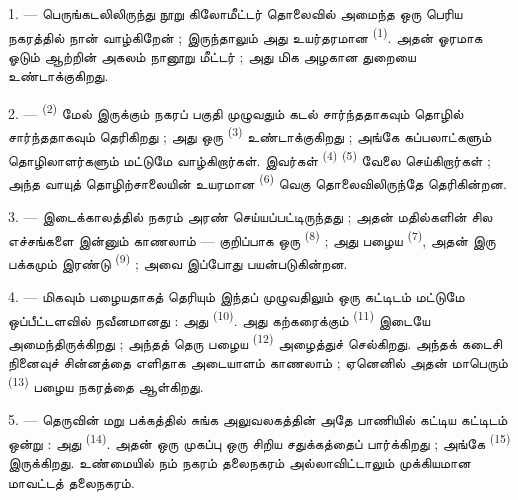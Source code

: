 \VUsaut{2.0mm}
\VUsaut{3.0mm}
\VUfilet{16mm}
\VUsaut{5.6mm}
\VUsaut{1.4mm}
\VUsaut{2.2mm}

\VUsaut{3.0mm}

1. --- பெருங்கடலிலிருந்து நூறு கிலோமீட்டர் தொலைவில் அமைந்த ஒரு பெரிய
நகரத்தில் நான் வாழ்கிறேன் ; இருந்தாலும் அது உயர்தரமான 
\textsuperscript{(1)}. அதன் ஓரமாக ஓடும் ஆற்றின் அகலம் நானூறு மீட்டர் ;
அது மிக அழகான துறையை உண்டாக்குகிறது.

2. ---  \textsuperscript{(2)} மேல் இருக்கும் நகரப்
பகுதி முழுவதும் கடல் சார்ந்ததாகவும் தொழில் சார்ந்ததாகவும் தெரிகிறது ;
அது ஒரு  \textsuperscript{(3)} உண்டாக்குகிறது ; அங்கே
கப்பலாட்களும் தொழிலாளர்களும் மட்டுமே வாழ்கிறார்கள். இவர்கள்
 \textsuperscript{(4)}  \textsuperscript{(5)} வேலை செய்கிறார்கள் ; அந்த
வாயுத் தொழிற்சாலையின் உயரமான 
\textsuperscript{(6)}  வெகு தொலைவிலிருந்தே
தெரிகின்றன.

3. --- இடைக்காலத்தில் நகரம் அரண் செய்யப்பட்டிருந்தது ; அதன் மதில்களின்
சில எச்சங்களை இன்னும் காணலாம் — குறிப்பாக ஒரு  \textsuperscript{(8)} ; அது பழைய
 \textsuperscript{(7)}, அதன் இரு பக்கமும் இரண்டு 
\textsuperscript{(9)} ; அவை இப்போது 
பயன்படுகின்றன.

4. --- மிகவும் பழையதாகத் தெரியும் இந்தப்  முழுவதிலும்
ஒரு கட்டிடம் மட்டுமே ஒப்பீட்டளவில் நவீனமானது : அது  \textsuperscript{(10)}. அது கற்கரைக்கும் 
\textsuperscript{(11)} இடையே அமைந்திருக்கிறது ; அந்தத் தெரு பழைய
 \textsuperscript{(12)} அழைத்துச் செல்கிறது.
அந்தக் கடைசி நினைவுச் சின்னத்தை எளிதாக அடையாளம் காணலாம் ; ஏனெனில்
அதன் மாபெரும்  \textsuperscript{(13)} பழைய
நகரத்தை ஆள்கிறது.

5. --- தெருவின் மறு பக்கத்தில் சுங்க அலுவலகத்தின் அதே பாணியில் கட்டிய
கட்டிடம் ஒன்று  : அது 
\textsuperscript{(14)}. அதன் ஒரு முகப்பு ஒரு சிறிய சதுக்கத்தைப்
பார்க்கிறது ; அங்கே  \textsuperscript{(15)}
இருக்கிறது. உண்மையில் நம் நகரம் தலைநகரம் அல்லாவிட்டாலும் முக்கியமான
மாவட்டத் தலைநகரம்.

